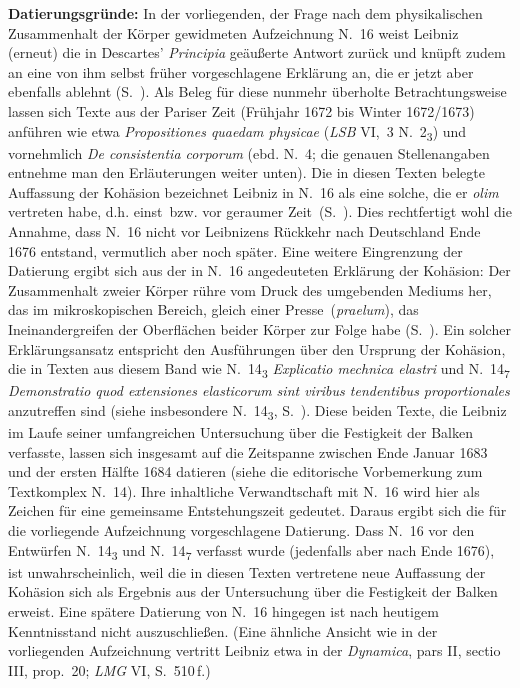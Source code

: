 \begin{ledgroup}
\footnotesize 
\pstart
\noindent\textbf{Datierungsgründe:}
In der vorliegenden, der Frage nach dem physikalischen Zusammenhalt der Körper gewidmeten Aufzeichnung N.~16 weist Leibniz (erneut) die in Descartes' \textit{Principia} geäußerte Antwort zurück und knüpft zudem an eine von ihm selbst früher vorgeschlagene Erklärung an, die er jetzt aber ebenfalls ablehnt (S.~).
Als Beleg für diese nunmehr überholte Betrachtungsweise lassen sich Texte aus der Pariser Zeit (Frühjahr 1672 bis Winter 1672/1673) anführen wie etwa \textit{Propositiones quae\-dam physicae} (\textit{LSB} VI,~3 N.~2\textsubscript{3}\cite{00258}) und vornehmlich \textit{De consistentia corporum} (ebd. N.~4\cite{01299}; die genauen Stellenangaben entnehme man den Erläuterungen weiter unten).
Die in diesen Texten belegte Auffassung der Kohäsion bezeichnet Leibniz in N.~16 als eine solche, die er \textit{olim} vertreten habe, d.h. \glqq einst\grqq\ bzw. \glqq vor geraumer Zeit\grqq\ (S.~).
Dies rechtfertigt wohl die Annahme, dass N.~16 nicht vor Leibnizens Rückkehr nach Deutschland Ende 1676 entstand, vermutlich aber noch später.
\pend%
\pstart%
Eine weitere Eingrenzung der Datierung ergibt sich aus der in N.~16 angedeuteten Erklärung der Kohäsion: Der Zusammenhalt zweier Körper rühre vom Druck des umgebenden Mediums her, das im mikroskopischen Bereich, gleich einer \glqq Presse\grqq\ (\textit{praelum}), das Ineinandergreifen der Oberflächen beider Körper zur Folge habe (S.~).
Ein solcher Erklärungsansatz entspricht den Ausführungen über den Ursprung der Kohäsion, die in Texten aus diesem Band wie N.~14\textsubscript{3} \textit{Explicatio mechnica elastri} und N.~14\textsubscript{7} \textit{Demonstratio quod extensiones elasticorum sint viribus tendentibus proportionales} anzutreffen sind (siehe insbesondere N.~14\textsubscript{3}, S.~).
Diese beiden Texte, die Leibniz im Laufe seiner umfangreichen Untersuchung über die Festigkeit der Balken verfasste, lassen sich insgesamt auf die Zeitspanne zwischen Ende Januar 1683 und der ersten Hälfte 1684 datieren (siehe die editorische Vorbemerkung zum Textkomplex N.~14).
Ihre inhaltliche Verwandtschaft mit N.~16 wird hier als Zeichen für eine gemeinsame Entstehungszeit gedeutet.
Daraus ergibt sich die für die vorliegende Aufzeichnung vorgeschlagene Datierung.
Dass N.~16 vor den Entwürfen N.~14\textsubscript{3} und N.~14\textsubscript{7} verfasst wurde (jedenfalls aber nach Ende 1676), ist unwahrscheinlich, weil die in diesen Texten vertretene neue Auffassung der Kohäsion sich als Ergebnis aus der Untersuchung über die Festigkeit der Balken erweist.
Eine spätere Datierung von N.~16 hingegen ist nach heutigem Kenntnisstand nicht auszuschließen. (Eine ähnliche Ansicht wie in der vorliegenden Aufzeichnung vertritt Leibniz etwa in der \textit{Dynamica}, pars II, sectio III, prop.~20;\cite{01354} \textit{LMG} VI, S.~510\,f.\cite{01043})
\pend 
\end{ledgroup}
